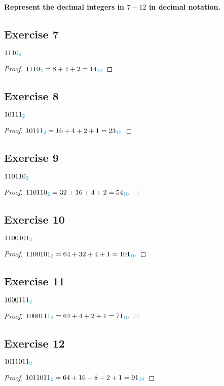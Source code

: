 \documentclass[14pt]{extarticle}
\newcommand{\base}[1]{{\color{cyan}#1}}
\begin{document}
{\bf \color{cyan} Represent the decimal integers in $7-12$ in decimal notation.}

\subsection{Exercise 7}
$1110_\base{2}$

\begin{proof}
    $1110_\base{2} = 8 + 4 + 2 = 14_\base{10}$
\end{proof}

\subsection{Exercise 8}
$10111_\base{2}$

\begin{proof}
    $10111_\base{2} = 16 + 4 + 2 + 1 = 23_\base{10}$
\end{proof}

\subsection{Exercise 9}
$110110_\base{2}$

\begin{proof}
    $110110_\base{2} = 32 + 16 + 4 + 2 = 54_\base{10}$
\end{proof}

\subsection{Exercise 10}
$1100101_\base{2}$

\begin{proof}
    $1100101_\base{2} = 64 + 32 + 4 + 1 = 101_\base{10}$
\end{proof}

\subsection{Exercise 11}
$1000111_\base{2}$

\begin{proof}
    $1000111_\base{2} = 64 + 4 + 2 + 1 = 71_\base{10}$
\end{proof}

\subsection{Exercise 12}
$1011011_\base{2}$

\begin{proof}
    $1011011_\base{2} = 64 + 16 + 8 + 2 + 1 = 91_\base{10}$
\end{proof}
\end{document}
